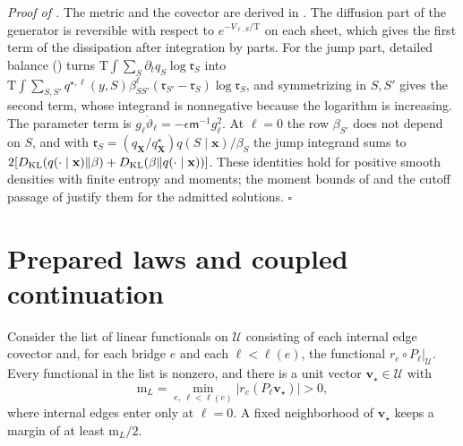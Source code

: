 \noindent\emph{Proof of .}
The metric and the covector are derived in .
The diffusion part of the generator is reversible with respect to
\(e^{-V_{\ell,S}/\mathrm T}\) on each sheet, which gives the first term of the
dissipation after integration by parts. For the jump part, detailed balance
() turns
\(\mathrm T\int\sum_S\partial_tq_S\log\mathfrak r_S\) into
\(\mathrm T\int\sum_{S,S'}q^{\star,\ell}(y,S)\beta^\ell_{SS'}
(\mathfrak r_{S'}-\mathfrak r_S)\log\mathfrak r_S\), and symmetrizing in
\(S,S'\) gives the second term, whose integrand is nonnegative because the
logarithm is increasing. The parameter term is
\(g_\ell\dot\vartheta_\ell=-\epsilon\mathsf m^{-1}g_\ell^2\). At \(\ell=0\) the
row \(\beta_{S'}\) does not depend on \(S\), and with
\(\mathfrak r_S=(q_{\mathbf X}/q^\star_{\mathbf X}) q(S\mid\mathbf x)/\beta_S\)
the jump integrand sums to
\(2[D_{\mathrm{KL}}(q(\cdot\mid\mathbf x)\Vert\beta)+D_{\mathrm{KL}}(\beta\Vert q(\cdot\mid\mathbf x))]\).
These identities hold for positive smooth densities with finite entropy and
moments; the moment bounds of  and
the cutoff passage of  justify them for
the admitted solutions. \(\square\)

\section{Prepared laws and coupled continuation}
\label{sec:rg-formation-continuation-proof}

Consider the list of linear functionals on \(\mathcal U\) consisting of each
internal edge covector and, for each bridge \(e\) and each \(\ell<\ell(e)\),
the functional \(r_e\circ P_\ell|_{\mathcal U}\). Every functional in the list
is nonzero, and there is a unit vector \(\mathbf v_\star\in\mathcal U\) with
\begin{equation}
\mathrm m_L=\min_{e,\ \ell<\ell(e)}
       |r_e(P_\ell\mathbf v_\star)|>0,
\label{eq:rg-formation-preparation-margin}
\end{equation}
where internal edges enter only at \(\ell=0\). A fixed neighborhood of
\(\mathbf v_\star\) keeps a margin of at least \(\mathrm m_L/2\).


